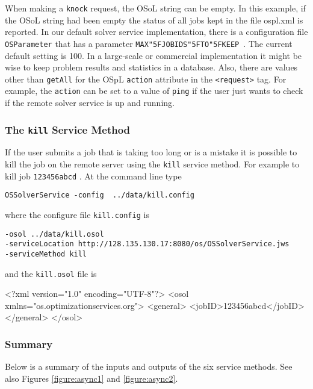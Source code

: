 \documentclass[11pt]{article}
\newcounter{Fig}
\renewcommand{\_}{{\char"5F}}
\renewcommand{\{}{{\char"7B}}
\renewcommand{\}}{{\char"7D}}
\renewcommand{\^}{{\char"0D}}
\renewcommand{\'}{{\char"0D}}
\begin{document}
When making a {\tt knock} request,  the OSoL string can be empty. In this example, if the OSoL string had been empty the status of all jobs kept in the file ospl.xml is reported.  In our default solver service implementation, there is a configuration file {\tt OSParameter} that has a parameter {\tt MAX\_JOBIDS\_TO\_KEEP }.  The current default setting is 100.  In a large-scale or commercial implementation it might be wise to keep problem results and statistics in a database.  Also, there are values other than {\tt getAll} for the OSpL {\tt action} attribute in the {\tt <request>} tag.  For example, the {\tt action} can be set to a value of {\tt ping} if the user just wants to check if the remote solver service is up and running. 



\subsubsection{The  {\tt kill}   Service Method}

If the user submits a job that is taking too long or is a mistake it is possible to kill the job on the remote server using the {\tt kill} service method. For example to kill job {\tt 123456abcd} .  At the command line type
\begin{verbatim}
OSSolverService -config  ../data/kill.config
\end{verbatim}
where the configure file {\tt kill.config} is
\begin{verbatim}
-osol ../data/kill.osol
-serviceLocation http://128.135.130.17:8080/os/OSSolverService.jws
-serviceMethod kill
\end{verbatim}
and the {\tt kill.osol} file is
\begin{verbatimtab}[4]
<?xml version="1.0" encoding="UTF-8"?>
<osol xmlns="os.optimizationservices.org">
 	<general>         
 		<jobID>123456abcd</jobID>  
	</general>
</osol>
\end{verbatimtab}


\subsubsection{Summary}

Below is a summary of the inputs and outputs of the six service methods. See also Figures \ref{figure:async1} and \ref{figure:async2}.
\end{document}
